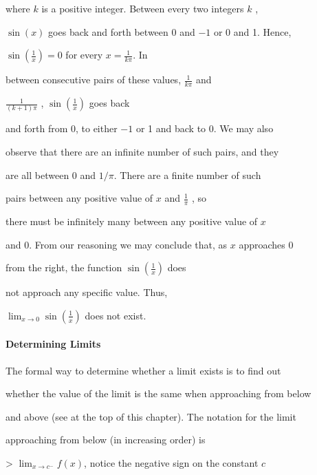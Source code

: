    where $k$ is a positive integer. Between every two integers $k$ ,

    $\sin(x)$ goes back and forth between 0 and $-1$ or 0 and 1. Hence,

    $\sin\left(\tfrac{1}{x}\right)=0$ for every $x=\tfrac{1}{k\pi}$. In

    between consecutive pairs of these values, $\tfrac{1}{k\pi}$ and

    $\tfrac{1}{(k+1)\pi}$ , $\sin\left(\tfrac{1}{x}\right)$ goes back

    and forth from 0, to either $-1$ or 1 and back to 0. We may also

    observe that there are an infinite number of such pairs, and they

    are all between 0 and $1/\pi$. There are a finite number of such

    pairs between any positive value of $x$ and $\tfrac{1}{\pi}$ , so

    there must be infinitely many between any positive value of $x$

    and 0. From our reasoning we may conclude that, as $x$ approaches 0

    from the right, the function $\sin\left(\tfrac{1}{x}\right)$ does

    not approach any specific value. Thus,

    $\lim_{x\to0}\sin\left(\tfrac{1}{x}\right)$ does not exist.








\paragraph{Determining Limits}



The formal way to determine whether a limit exists is to find out

whether the value of the limit is the same when approaching from below

and above (see at the top of this chapter). The notation for the limit

approaching from below (in increasing order) is



> $\lim_{x\to c^-}f(x)$, notice the negative sign on the constant $c$



